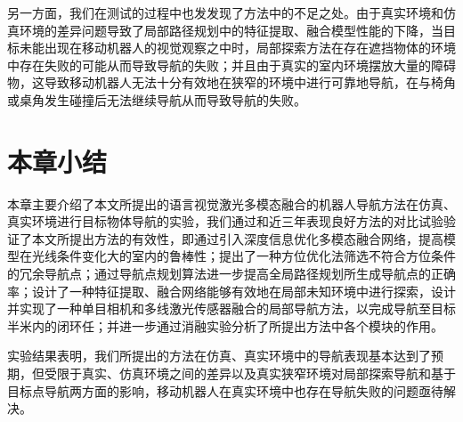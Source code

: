 另一方面，我们在测试的过程中也发发现了方法中的不足之处。由于真实环境和仿真环境的差异问题导致了局部路径规划中的特征提取、融合模型性能的下降，当目标未能出现在移动机器人的视觉观察之中时，局部探索方法在存在遮挡物体的环境中存在失败的可能从而导致导航的失败；并且由于真实的室内环境摆放大量的障碍物，这导致移动机器人无法十分有效地在狭窄的环境中进行可靠地导航，在与椅角或桌角发生碰撞后无法继续导航从而导致导航的失败。


\section{本章小结}

本章主要介绍了本文所提出的语言视觉激光多模态融合的机器人导航方法在仿真、真实环境进行目标物体导航的实验，我们通过和近三年表现良好方法的对比试验验证了本文所提出方法的有效性，即通过引入深度信息优化多模态融合网络，提高模型在光线条件变化大的室内的鲁棒性；提出了一种方位优化法筛选不符合方位条件的冗余导航点；通过导航点规划算法进一步提高全局路径规划所生成导航点的正确率；设计了一种特征提取、融合网络能够有效地在局部未知环境中进行探索，设计并实现了一种单目相机和多线激光传感器融合的局部导航方法，以完成导航至目标半米内的闭环任；并进一步通过消融实验分析了所提出方法中各个模块的作用。

实验结果表明，我们所提出的方法在仿真、真实环境中的导航表现基本达到了预期，但受限于真实、仿真环境之间的差异以及真实狭窄环境对局部探索导航和基于目标点导航两方面的影响，移动机器人在真实环境中也存在导航失败的问题亟待解决。